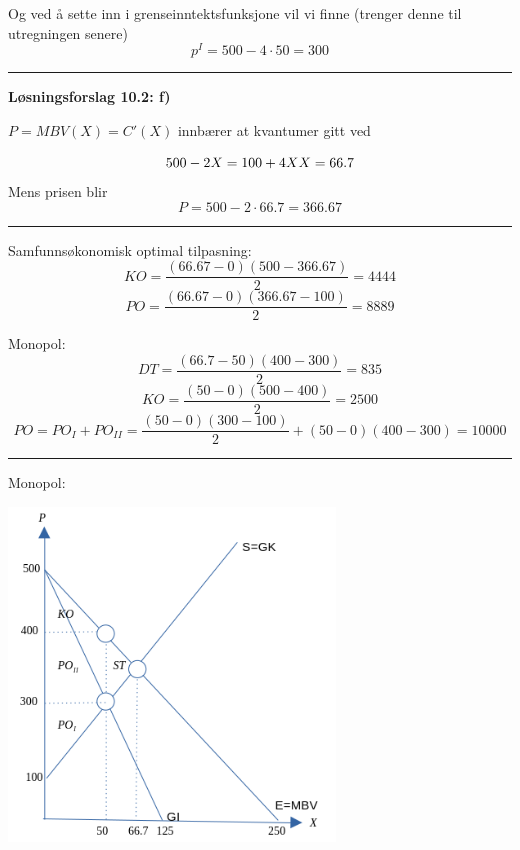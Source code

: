 \documentclass[
  letterpaper,
  DIV=11,
  numbers=noendperiod]{scrartcl}
\begin{document}
Og ved å sette inn i grenseinntektsfunksjone vil vi finne (trenger denne
til utregningen senere) \begin{equation*}
p^{I}= 500-4\cdot 50 = 300
\end{equation*}

\begin{center}\rule{0.5\linewidth}{0.5pt}\end{center}

\textbf{Løsningsforslag 10.2: f)}

\(P=MBV(X)=C'(X)\) innbærer at kvantumer gitt ved

\begin{equation*}
500-2X=100 + 4X \\
X=66.7
\end{equation*} Mens prisen blir \[
P=500-2\cdot 66.7 =366.67
\]

\begin{center}\rule{0.5\linewidth}{0.5pt}\end{center}

Samfunnsøkonomisk optimal tilpasning: \begin{equation*}
KO=\frac{(66.67-0)(500-366.67)}{2}=4444
\end{equation*} \begin{equation*}
PO=\frac{(66.67-0)(366.67-100)}{2}=8889
\end{equation*}

Monopol: \begin{equation*}
DT=\frac{(66.7-50)(400-300)}{2}=835
\end{equation*} \begin{equation*}
KO=\frac{(50-0)(500-400)}{2}=2500
\end{equation*} \begin{equation*}
PO=PO_{I}+PO_{II}=\frac{(50-0)(300-100)}{2}+(50-0)(400-300)=10000
\end{equation*}

\begin{center}\rule{0.5\linewidth}{0.5pt}\end{center}

Monopol:

\includegraphics[width=0.65\textwidth,height=\textheight]{drawio/m_mm.png}
\end{document}
